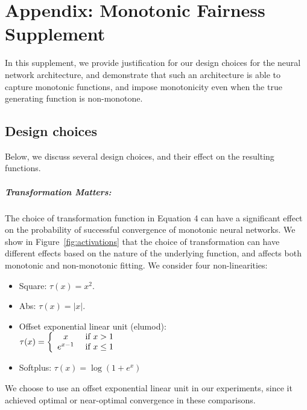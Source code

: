 \chapter{Appendix: Monotonic Fairness Supplement}

In this supplement, we provide justification for our design choices for the neural network architecture, and demonstrate that such an architecture is able to capture monotonic functions, and impose monotonicity even when the true generating function is non-monotone.

\section{Design choices}
    Below, we discuss several design choices, and their effect on the resulting functions.

    \paragraph{Transformation Matters:} 
        The choice of transformation function in Equation 4 can have a significant effect on the probability of successful convergence of monotonic neural networks.  We show in Figure~\ref{fig:activations} that the choice of transformation can have different effects based on the nature of the underlying function, and affects both monotonic and non-monotonic fitting. We consider four non-linearities:
        \begin{itemize}
            \item Square: $\tau(x) = x^2$.
            \item Abs: $\tau(x) = |x|$.
            \item Offset exponential linear unit (elumod): \\$ \tau(x) = \left\{\begin{array}{c l} 
                    x       & ~\mbox{if}~ x > 1 \\ 
                    e^{x-1} & ~\mbox{if}~ x \le 1 \\ 
                \end{array}\right.$
            \item Softplus: $\tau(x) = \log(1+e^x)$
        \end{itemize}
        We choose to use an offset exponential linear unit in our experiments, since it achieved optimal or near-optimal convergence in these comparisons.
        
